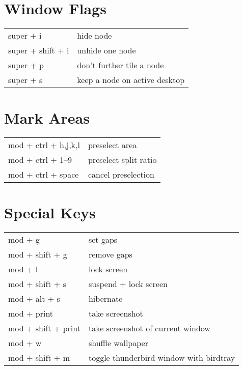 \documentclass[
    10pt,
    a4paper,
    notitlepage,
]{scrartcl}
\begin{document}
\section{Window Flags}
\begin{tabular}{p{4cm}l}
    super + i           & hide node                         \\
    super + shift + i   & unhide one node                   \\
    super + p           & don't further tile a node         \\
    super + s           & keep a node on active desktop
\end{tabular}

\section{Mark Areas}
\begin{tabular}{p{4cm}l}
    mod + ctrl + h,j,k,l & preselect area                    \\
    mod + ctrl + 1--9    & preselect split ratio             \\
    mod + ctrl + space   & cancel preselection
\end{tabular}

\section{Special Keys}
\begin{tabular}{p{4cm}l}
    mod + g             & set gaps                                  \\
    mod + shift + g     & remove gaps                               \\
    mod + l             & lock screen                               \\
    mod + shift + s     & suspend + lock screen                     \\
    mod + alt + s       & hibernate                                 \\
    mod + print         & take screenshot                           \\
    mod + shift + print & take screenshot of current window         \\
    mod + w             & shuffle wallpaper                         \\
    mod + shift + m     & toggle thunderbird window with birdtray
\end{tabular}
\end{document}
